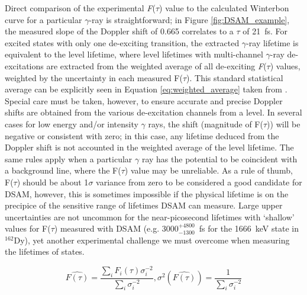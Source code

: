 Direct comparison of the experimental \textit{F}(\textit{$\tau$}) value to the calculated Winterbon curve for a particular $\gamma$-ray is straightforward; in Figure \ref{fig:DSAM_example}, the measured slope of the Doppler shift of 0.665 correlates to a \textit{$\tau$} of 21~fs. For excited states with only one de-exciting transition, the extracted $\gamma$-ray lifetime is equivalent to the level lifetime, where level lifetimes with multi-channel $\gamma$-ray de-excitations are extracted from the weighted average of all de-exciting \textit{F}(\textit{$\tau$}) values, weighted by the uncertainty in each measured F($\tau$). This standard statistical average can be explicitly seen in Equation \ref{eq:weighted_average} taken from \cite{Bevington_text}. Special care must be taken, however, to ensure accurate and precise Doppler shifts are obtained from the various de-excitation channels from a level. In several cases for low energy and/or intensity $\gamma$ rays, the shift (magnitude of F($\tau$)) will be negative or consistent with zero; in this case, any lifetime deduced from the Doppler shift is not accounted in the weighted average of the level lifetime. The same rules apply when a particular $\gamma$ ray has the potential to be coincident with a background line, where the F($\tau$) value may be unreliable. As a rule of thumb, F($\tau$) should be about 1$\sigma$ variance from zero to be considered a good candidate for DSAM, however, this is sometimes impossible if the physical lifetime is on the precipice of the sensitive range of lifetimes DSAM can measure. Large upper uncertainties are not uncommon for the near-picosecond lifetimes with `shallow' values for F($\tau$) measured with DSAM (e.g. 3000$^{+4800}_{-1300}$~fs for the 1666~keV state in $^{162}$Dy), yet another experimental challenge we must overcome when measuring the lifetimes of states.

\begin{equation}\label{eq:weighted_average}
\widehat{F(\tau)}=\frac{\sum_{i} F_i(\tau) \sigma^{-2}_i}{\sum_{i}\sigma^{-2}_i}, \sigma^2(\widehat{F(\tau)})=\frac{1}{\sum_i \sigma^{-2}_i}
\end{equation}

